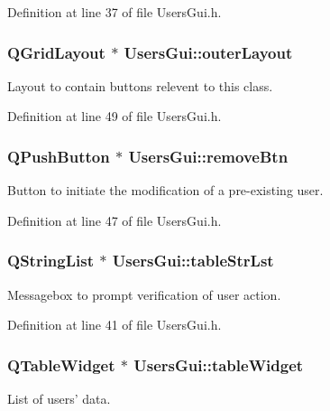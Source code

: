 Definition at line 37 of file Users\-Gui.\-h.

\hypertarget{class_users_gui_a39c97994b8b367069c5d4b1aa5e7a1df}{
\subsubsection[{outer\-Layout}]{\setlength{\rightskip}{0pt plus 5cm}Q\-Grid\-Layout $\ast$ Users\-Gui\-::outer\-Layout\hspace{0.3cm}{\ttfamily [private]}}}\label{class_users_gui_a39c97994b8b367069c5d4b1aa5e7a1df}
Layout to contain buttons relevent to this class. 

Definition at line 49 of file Users\-Gui.\-h.

\hypertarget{class_users_gui_a6b6649374ed3a00b5e714ad2ea868ef7}{
\subsubsection[{remove\-Btn}]{\setlength{\rightskip}{0pt plus 5cm}Q\-Push\-Button $\ast$ Users\-Gui\-::remove\-Btn\hspace{0.3cm}{\ttfamily [private]}}}\label{class_users_gui_a6b6649374ed3a00b5e714ad2ea868ef7}
Button to initiate the modification of a pre-\/existing user. 

Definition at line 47 of file Users\-Gui.\-h.

\hypertarget{class_users_gui_ac67b9bbba0ce047974c41af428a78890}{
\subsubsection[{table\-Str\-Lst}]{\setlength{\rightskip}{0pt plus 5cm}Q\-String\-List $\ast$ Users\-Gui\-::table\-Str\-Lst\hspace{0.3cm}{\ttfamily [private]}}}\label{class_users_gui_ac67b9bbba0ce047974c41af428a78890}
Messagebox to prompt verification of user action. 

Definition at line 41 of file Users\-Gui.\-h.

\hypertarget{class_users_gui_aefd7e17606815c3ed57943a671733a76}{
\subsubsection[{table\-Widget}]{\setlength{\rightskip}{0pt plus 5cm}Q\-Table\-Widget $\ast$ Users\-Gui\-::table\-Widget\hspace{0.3cm}{\ttfamily [private]}}}\label{class_users_gui_aefd7e17606815c3ed57943a671733a76}
List of users' data. 

